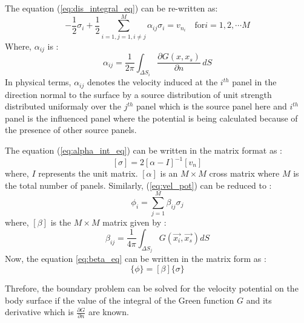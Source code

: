 The equation (\ref{eq:dis_integral_eq}) can be re-written as:
\begin{equation}
    \label{eq:alpha_int_eq}
    -\frac{1}{2}\sigma_i + \frac{1}{2}\sum_{i=1, j=1, i\ne j}^{M}\alpha_{ij}\sigma_i = v_{n_i} \quad \text{for} i = 1, 2, \cdots M
\end{equation}
Where, $\alpha_{ij}$ is : 
\begin{equation}
    \label{eq:alpha}
    \alpha_{ij} = \frac{1}{2\pi}\int_{\Delta S_i}\frac{\partial G(x, x_s)}{\partial n} \,dS
\end{equation}
In physical terms, $\alpha_{ij}$ denotes the velocity induced at the $i^{th}$ panel in the direction normal to the surface by a source distribution of unit strength distributed uniformaly over the $j^{th}$ panel which is the source panel here and $i^{th}$ panel is the influenced panel where the potential is being calculated because of the presence of other source panels.

The equation (\ref{eq:alpha_int_eq}) can be written in the matrix format as :
\begin{equation}
    \label{eq:sigma_alpha}
    [\sigma] = 2[\alpha - I]^{-1}[v_n]
\end{equation}
where, $I$ represents the unit matrix. $[\alpha]$ is an $M\times M$ cross matrix where $M$ is 
the total number of panels. Similarly, (\ref{eq:vel_pot}) can be reduced to : 
\begin{equation}
    \label{eq:beta_eq}
    \phi_i = \sum_{j=1}^{M}\beta_{ij}\sigma_{j}
\end{equation}
where, $[\beta]$ is the $M\times M$ matrix given by :
\begin{equation}
    \label{eq:beta_eq}
    \beta_{ij} = \frac{1}{4\pi}\int_{\Delta S_j}G(\Vec{x_i}, \vec{x_s}) dS  
\end{equation}
Now, the equation \ref{eq:beta_eq} can be written in the matrix form as :
\begin{equation}
    \{\phi\} = [\beta]\{\sigma\}
\end{equation}

Threfore, the boundary problem can be solved for the velocity potential on the body surface 
if the value of the integral of the Green function $G$ and its derivative which is
$\frac{\partial G}{\partial n}$ are known.
